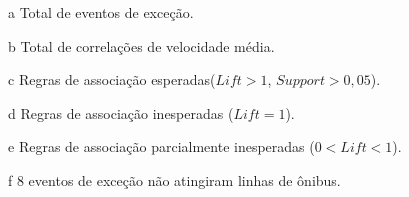 \documentclass[
	12pt,				%
	oneside,			%
	a4paper,			%
	english,			%
	brazil				%
	]{abntex2ppgsi}
\begin{document}
{{{\begin{apendicesenv}
\begin{table}[!htb]
\begin{threeparttable}
\begin{tablenotes}
            \item[a] Total de eventos de exceção.
            \item[b] Total de correlações de velocidade média.
            \item[c] Regras de associação esperadas($Lift > 1$, $Support > 0,05$).
            \item[d] Regras de associação inesperadas ($Lift = 1$).
            \item[e] Regras de associação parcialmente inesperadas ($0 < Lift < 1$).
            \item[f] 8 eventos de exceção não atingiram linhas de ônibus.
        \end{tablenotes}
\end{threeparttable}
\end{table}



\end{apendicesenv}}}}
\end{document}
